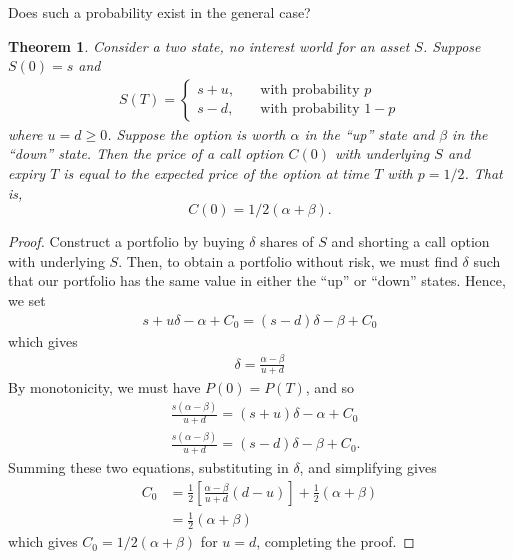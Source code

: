\documentclass[12pt]{article}
\theoremstyle{plain}
\newtheorem{theorem}{Theorem}
\theoremstyle{definition}
\theoremstyle{remark}
\numberwithin{equation}{section}  %
\begin{document}
Does such a probability exist in the general case?
\begin{theorem}\label{thm:risk-neutral}
	Consider a two state, no interest world for an asset $S$. Suppose $S(0) = s$
	and 
	\begin{equation*}
		\begin{split}
			S(T) = \begin{cases}
				s + u, \quad & \text{with probability }p \\
				s - d, \quad & \text{with probability }1-p
			\end{cases}
		\end{split}
	\end{equation*}
	where $u = d \ge 0$. Suppose the option is worth $\alpha$ in the ``up'' state
	and $\beta$ in the ``down'' state.
	Then the price of a call option $C(0)$ with underlying
	$S$ and expiry $T$ is equal to the expected price of the option at time $T$
	with $p = 1/2$. That is, \[ C(0) = 1/2(\alpha + \beta). \]
\end{theorem}
\begin{proof}
	Construct a portfolio by buying $\delta$
	shares of $S$ and shorting a call option with underlying $S$.
	Then, to obtain a portfolio without risk, we must find $\delta$ such that
	our portfolio has the same value in either the ``up'' or ``down'' states.
	Hence, we set 
	\begin{equation*}
		\begin{split}
			s + u \delta - \alpha + C_{0} = (s - d) \delta - \beta + C_{0}
		\end{split}
	\end{equation*}
	which gives
	\begin{equation*}
		\begin{split}
			\delta = \frac{\alpha - \beta}{u + d}
		\end{split}
	\end{equation*}
	By monotonicity, we must have $P(0) = P(T)$,
	and so
	\begin{equation*}
		\begin{split}
			& \frac{s(\alpha - \beta)}{u + d} = (s + u) \delta - \alpha + C_{0} \\
			& \frac{s(\alpha - \beta)}{u + d} = (s - d) \delta - \beta + C_{0}. 
		\end{split}
	\end{equation*}
	Summing these two equations, substituting in $\delta$, and simplifying gives
	\begin{equation}\label{rn-drift}
		\begin{split}
			C_{0} & =
			\frac{1}{2} \left [ \frac{\alpha - \beta}{u + d} (d - u) \right ]
			+ \frac{1}{2}(\alpha + \beta)
			\\
			& = \frac{1}{2}(\alpha + \beta)
		\end{split}
	\end{equation}
	which gives $C_{0} = 1/2(\alpha + \beta)$ for $u = d$, completing the proof.
\end{proof}
\end{document}
